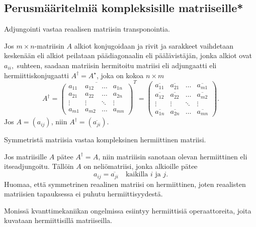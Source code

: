 \documentclass[a4paper, 12pt]{article}
\theoremstyle{remark}
\theoremstyle{definition}
\renewcommand{\bar}[1]{\overline{#1}}
\begin{document}
\subsection{Perusmääritelmiä kompleksisille matriiseille*}
Adjungointi vastaa reaalisen matriisin transponointia.
\begin{maar}[Adjungaatti]
Jos $m\times n$-matriisin $A$ alkiot konjugoidaan ja rivit ja sarakkeet vaihdetaan keskenään eli alkiot peilataan päädiagonaalin eli päälävistäjän, jonka alkiot ovat $a_{ii},$ suhteen, saadaan matriisin hermitoitu matriisi eli adjungaatti eli hermiittiskonjugaatti $A^{\dagger}=A^{\star}$, joka on kokoa $n\times m$
$$
A^{\dagger}=\bar{\begin{pmatrix} 
   a_{11} &  a_{12}  & \ldots & a_{1n}\\
a_{21}  &  a_{22} & \ldots & a_{2n}\\
\vdots & \vdots & \ddots & \vdots\\
a_{m1}  &   a_{m2}       &\ldots & a_{mn}     
    \end{pmatrix}}^T=
    \begin{pmatrix} 
   \bar{a_{11}} &  \bar{a_{21}}  & \ldots & \bar{a_{m1}}\\
\bar{a_{12}}  &  \bar{a_{22}} & \ldots & \bar{a_{m2}}\\
\vdots & \vdots & \ddots & \vdots\\
\bar{a_{1n} } &   \bar{a_{2n}}       &\ldots & \bar{a_{mn}}   
    \end{pmatrix}.
$$
Jos $A=(a_{ij})$, niin $A^{\dagger}=(\bar{a_{ji}}).$
\end{maar}

Symmetristä matriisia vastaa kompleksinen hermiittinen matriisi.
\begin{maar}
Jos matriisille $A$ pätee $A^{\dagger}=A$, niin matriiisin sanotaan olevan hermiittinen eli itseadjungoitu. Tällöin $A$ on neliömatriisi, jonka alkioille pätee
$$a_{ij}=\bar{a_{ji}}\quad\text{kaikilla }i \text{ ja }j.$$
Huomaa, että symmetrinen reaalinen matriisi on hermiittinen, joten reaalisten matriisien tapauksessa ei puhutu hermiittisyydestä.

Monissä kvanttimekaniikan ongelmissa esiintyy hermiittisiä operaattoreita, joita kuvataan hermiittisillä matriiseilla.
\end{maar}


\clearpage
\end{document}
